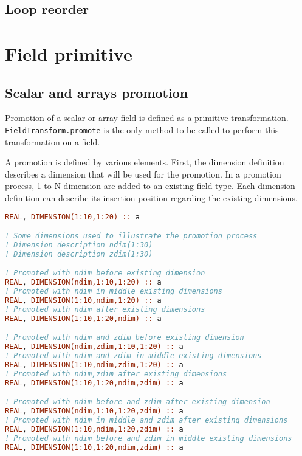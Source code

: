 \subsection{Loop reorder}

\section{Field primitive}


\subsection{Scalar and arrays promotion}
Promotion of a scalar or array field is defined as a primitive transformation.
\lstinline|FieldTransform.promote| is the only method to be called to perform
this transformation on a field.

A promotion is defined by various elements. First, the dimension definition 
describes a dimension that will be used for the promotion.
In a promotion process, 1 to N dimension are added to an existing field type. 
Each dimension definition can describe its insertion position regarding the 
existing dimensions.


\begin{lstlisting}[language=fortran]
REAL, DIMENSION(1:10,1:20) :: a

! Some dimensions used to illustrate the promotion process
! Dimension description ndim(1:30)
! Dimension description zdim(1:30)

! Promoted with ndim before existing dimension
REAL, DIMENSION(ndim,1:10,1:20) :: a
! Promoted with ndim in middle existing dimensions
REAL, DIMENSION(1:10,ndim,1:20) :: a
! Promoted with ndim after existing dimensions
REAL, DIMENSION(1:10,1:20,ndim) :: a

! Promoted with ndim and zdim before existing dimension
REAL, DIMENSION(ndim,zdim,1:10,1:20) :: a
! Promoted with ndim and zdim in middle existing dimensions
REAL, DIMENSION(1:10,ndim,zdim,1:20) :: a
! Promoted with ndim,zdim after existing dimensions
REAL, DIMENSION(1:10,1:20,ndim,zdim) :: a

! Promoted with ndim before and zdim after existing dimension
REAL, DIMENSION(ndim,1:10,1:20,zdim) :: a
! Promoted with ndim in middle and zdim after existing dimensions
REAL, DIMENSION(1:10,ndim,1:20,zdim) :: a
! Promoted with ndim before and zdim in middle existing dimensions
REAL, DIMENSION(1:10,1:20,ndim,zdim) :: a
\end{lstlisting}
